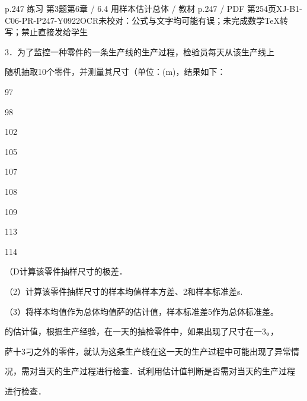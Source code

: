 \begin{bankitem}{p.247 练习 第3题}{第6章 / 6.4 用样本估计总体 / 教材 p.247 / PDF 第254页}{XJ-B1-C06-PR-P247-Y0922}{OCR未校对：公式与文字均可能有误；未完成数学TeX转写；禁止直接发给学生}
\begin{ocrdraft}
\par
3．为了监控一种零件的一条生产线的生产过程，检验员每天从该生产线上
\par
随机抽取10个零件，并测量其尺寸（单位：(m)，结果如下：
\par
97
\par
98
\par
102
\par
105
\par
107
\par
108
\par
109
\par
113
\par
114
\par
（D计算该零件抽样尺寸的极差．
\par
（2）计算该零件抽样尺寸的样本均值样本方差、2和样本标准差s.
\par
（3）将样本均值作为总体均值萨的估计值，样本标准差5作为总体标准差。
\par
的估计值，根据生产经验，在一天的抽检零件中，如果出现了尺寸在一3。，
\par
萨十3刁之外的零件，就认为这条生产线在这一天的生产过程中可能出现了异常情
\par
况，需对当天的生产过程进行检查．试利用估计值判断是否需对当天的生产过程
\par
进行检查．
\end{ocrdraft}
\end{bankitem}
